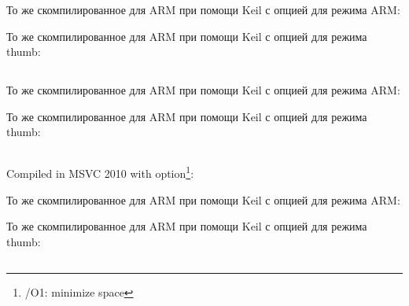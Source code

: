 

То же скомпилированное для ARM при помощи Keil с опцией \Othree для режима ARM:



То же скомпилированное для ARM при помощи Keil с опцией \Othree для режима thumb:



\subsection{}





То же скомпилированное для ARM при помощи Keil с опцией \Othree для режима ARM:



То же скомпилированное для ARM при помощи Keil с опцией \Othree для режима thumb:



\subsection{}

{Compiled in MSVC 2010 with  option\footnote{/O1: minimize space}:}



То же скомпилированное для ARM при помощи Keil с опцией \Othree для режима ARM:



То же скомпилированное для ARM при помощи Keil с опцией \Othree для режима thumb:



\subsection{}

